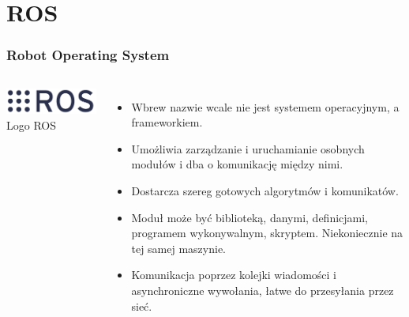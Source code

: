 \documentclass{beamer}
\begin{document}
	\section{ROS}
	\begin{frame}
		\frametitle{Robot Operating System}
		\begin{columns}[c]
			\centering
			\includegraphics[width=\textwidth]{graphics/ros_logo.png} \\
			Logo ROS\footnotemark
			\begin{itemize}
				\item Wbrew nazwie wcale nie jest systemem operacyjnym, a frameworkiem.
				\item Umożliwia zarządzanie i uruchamianie osobnych modułów i dba o komunikację między nimi.
				\item Dostarcza szereg gotowych algorytmów i komunikatów.
				\item Moduł może być biblioteką, danymi, definicjami, programem wykonywalnym, skryptem. Niekoniecznie na tej samej maszynie.
				\item Komunikacja poprzez kolejki wiadomości i asynchroniczne wywołania, łatwe do przesyłania przez sieć.
			\end{itemize}
		\end{columns}
	\end{frame}
\end{document}

